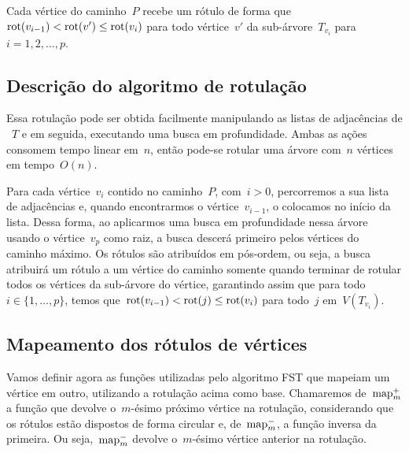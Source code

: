 	\bigskip

	Cada vértice do caminho~$P$ recebe 
	um rótulo de forma
		que~${\mathrm{rot}(v_{i-1})<\mathrm{rot}(v') \le \mathrm{rot}(v_i)}$ para todo 
		vértice~$v'$ da sub-árvore~$T_{v_i}$ para~$i=1,2,\ldots,p$. 

	\bigskip
	\bigskip

	\subsection{Descrição do algoritmo de rotulação}
	Essa rotulação pode ser obtida facilmente 
	manipulando as listas de adjacências de ~$T$ e em seguida,
	executando uma busca em profundidade.
	Ambas as ações consomem tempo linear em~$n$, então
	pode-se rotular uma árvore com~$n$ vértices em tempo~$O(n)$.

	Para cada vértice~$v_i$ contido no caminho~$P$, com~$i>0$,
	percorremos a sua lista de adjacências e, quando encontrarmos o 
	vértice~$v_{i-1}$, o colocamos no início da lista.
	Dessa forma, ao aplicarmos uma busca em profundidade nessa 
	árvore usando o vértice~$v_p$ como raiz, a busca descerá primeiro
	pelos vértices do caminho máximo.
	Os rótulos são atribuídos em pós-ordem, ou seja, a busca
	atribuirá um rótulo
	a um vértice do caminho
	somente quando terminar de rotular todos os vértices da sub-árvore
	do vértice, 
	garantindo assim que para todo~$i\in \{1,\ldots, p\}$, temos 
	que~$\mathrm{rot}(v_{i-1})<\mathrm{rot}(j)\le\mathrm{rot}(v_i)$ para todo~$j$ 
	em~$V(T_{v_i})$.
	
	\bigskip
	\bigskip
	\bigskip

	\subsection{Mapeamento dos rótulos de vértices }
	\label{sec:map}
	Vamos definir agora as funções
	utilizadas pelo algoritmo FST
	que mapeiam um vértice em 
	outro, utilizando a rotulação acima como base.
	Chamaremos de~${\mathrm{map}^+_m}$ a função que devolve o~$m$-ésimo 
	próximo vértice na rotulação, considerando que os rótulos
	estão dispostos de forma circular
	e, de~${\mathrm{map}^-_m}$, a função inversa da primeira. 
	Ou seja,~${\mathrm{map}^-_m}$ devolve o~$m$-ésimo vértice anterior
	na rotulação.


